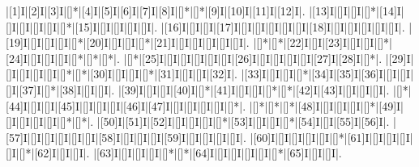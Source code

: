\begin{Puzzle}{15}{15}
|[1]I|[2]I|[3]I|[]*|[4]I|[5]I|[6]I|[7]I|[8]I|[]*|[]*|[9]I|[10]I|[11]I|[12]I|.
|[13]I|[]I|[]I|[]*|[14]I|[]I|[]I|[]I|[]I|[]*|[15]I|[]I|[]I|[]I|[]I|.
|[16]I|[]I|[]I|[17]I|[]I|[]I|[]I|[]I|[]I|[18]I|[]I|[]I|[]I|[]I|[]I|.
|[19]I|[]I|[]I|[]I|[]*|[20]I|[]I|[]I|[]*|[21]I|[]I|[]I|[]I|[]I|[]I|.
|[]*|[]*|[22]I|[]I|[23]I|[]I|[]I|[]*|[24]I|[]I|[]I|[]I|[]*|[]*|[]*|.
|[]*|[25]I|[]I|[]I|[]I|[]I|[]I|[26]I|[]I|[]I|[]I|[]I|[27]I|[28]I|[]*|.
|[29]I|[]I|[]I|[]I|[]I|[]*|[]*|[30]I|[]I|[]I|[]*|[31]I|[]I|[]I|[32]I|.
|[33]I|[]I|[]I|[]*|[34]I|[35]I|[36]I|[]I|[]I|[]I|[37]I|[]*|[38]I|[]I|[]I|.
|[39]I|[]I|[]I|[40]I|[]*|[41]I|[]I|[]I|[]*|[]*|[42]I|[43]I|[]I|[]I|[]I|.
|[]*|[44]I|[]I|[]I|[45]I|[]I|[]I|[]I|[46]I|[47]I|[]I|[]I|[]I|[]I|[]*|.
|[]*|[]*|[]*|[48]I|[]I|[]I|[]I|[]*|[49]I|[]I|[]I|[]I|[]I|[]*|[]*|.
|[50]I|[51]I|[52]I|[]I|[]I|[]I|[]*|[53]I|[]I|[]I|[]*|[54]I|[]I|[55]I|[56]I|.
|[57]I|[]I|[]I|[]I|[]I|[]I|[58]I|[]I|[]I|[]I|[59]I|[]I|[]I|[]I|[]I|.
|[60]I|[]I|[]I|[]I|[]I|[]*|[61]I|[]I|[]I|[]I|[]I|[]*|[62]I|[]I|[]I|.
|[63]I|[]I|[]I|[]I|[]*|[]*|[64]I|[]I|[]I|[]I|[]I|[]*|[65]I|[]I|[]I|.
\end{Puzzle}